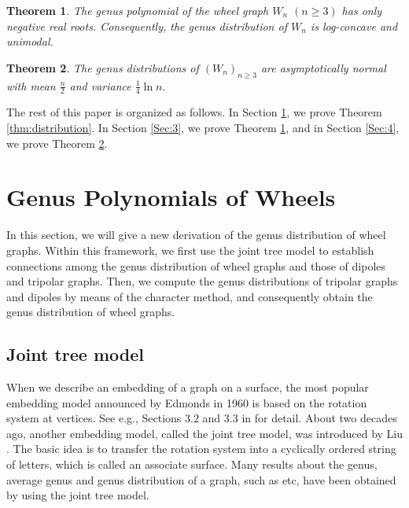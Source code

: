 \documentclass[12pt]{article}
\newtheorem{theorem}{Theorem}[section]
\theoremstyle{definition}
\begin{document}
\begin{theorem}
\label{thm:main}
The genus polynomial of the wheel graph $W_n$ $(n\geq 3)$ has only
negative real roots. Consequently, the genus distribution of \(W_n\) is log-concave and unimodal.
\end{theorem}

\begin{theorem}
\label{thm:normal}
The genus distributions of \((W_n)_{n\geq3}\) are  asymptotically normal with mean
$\frac{n}{2}$ and variance $\frac14\ln n.$
\end{theorem}

The rest of this paper is organized as follows.
In Section \ref{Sec:2}, we prove Theorem \ref{thm:distribution}.
In Section \ref{Sec:3}, we prove Theorem \ref{thm:main}, and in Section \ref{Sec:4}, we prove Theorem \ref{thm:normal}.


\section{Genus Polynomials of Wheels}\label{Sec:2}
In this section, we will give a new derivation of the genus distribution of wheel graphs. Within this framework, we first use the joint tree model to establish connections among the genus distribution of wheel graphs and those of dipoles and tripolar graphs. Then, we compute  the genus distributions of tripolar graphs and dipoles by means of the character method, and consequently obtain the genus distribution of wheel graphs.

\subsection{Joint tree model}
When we describe an embedding of a graph on a surface, the most popular embedding model announced by Edmonds in 1960 is based on the rotation system at vertices. See e.g., Sections $3.2$ and $3.3$ in \cite{MT01} for detail. About two decades ago, another embedding model, called the joint tree model, was introduced by Liu \cite{liu08}. The basic idea is to transfer the rotation system into a cyclically ordered string of letters, which is called an associate surface. Many results about the genus, average genus and genus distribution of a graph, such as \cite{Chen10,SL08,SL10a,SL10,WL08,YL07} etc, have been obtained by using the joint tree model.
\end{document}
